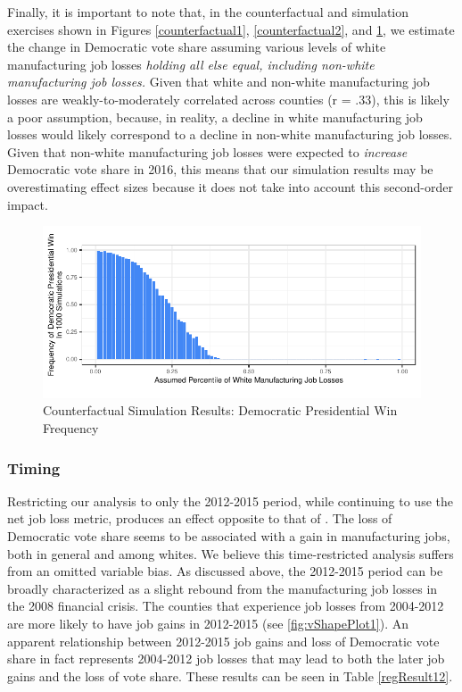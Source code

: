 \documentclass[]{AEA}
\begin{document}
Finally, it is important to note that, in the counterfactual and
simulation exercises shown in Figures \ref{counterfactual1},
\ref{counterfactual2}, and \ref{counterfactual3}, we estimate the change
in Democratic vote share assuming various levels of white manufacturing
job losses \emph{holding all else equal, including non-white
manufacturing job losses.} Given that white and non-white manufacturing
job losses are weakly-to-moderately correlated across counties (r =
.33), this is likely a poor assumption, because, in reality, a decline
in white manufacturing job losses would likely correspond to a decline
in non-white manufacturing job losses. Given that non-white
manufacturing job losses were expected to \emph{increase} Democratic
vote share in 2016, this means that our simulation results may be
overestimating effect sizes because it does not take into account this
second-order impact.

\FloatBarrier
\begin{figure} 
\caption{Counterfactual Simulation Results: Democratic Presidential Win Frequency}
\label{counterfactual3}

\begin{center}\includegraphics{Final-Draft_files/figure-latex/unnamed-chunk-8-1} \end{center}



\FloatBarrier
\end{figure}
\FloatBarrier
\subsubsection{Timing}

Restricting our analysis to only the 2012-2015 period, while continuing
to use the net job loss metric, produces an effect opposite to that of
\cite{Baccini21}. The loss of Democratic vote share seems to be
associated with a gain in manufacturing jobs, both in general and among
whites. We believe this time-restricted analysis suffers from an omitted
variable bias. As discussed above, the 2012-2015 period can be broadly
characterized as a slight rebound from the manufacturing job losses in
the 2008 financial crisis. The counties that experience job losses from
2004-2012 are more likely to have job gains in 2012-2015 (see
\ref{fig:vShapePlot1}). An apparent relationship between 2012-2015 job
gains and loss of Democratic vote share in fact represents 2004-2012 job
losses that may lead to both the later job gains and the loss of vote
share. These results can be seen in Table \ref{regResult12}.
\FloatBarrier
\end{document}
